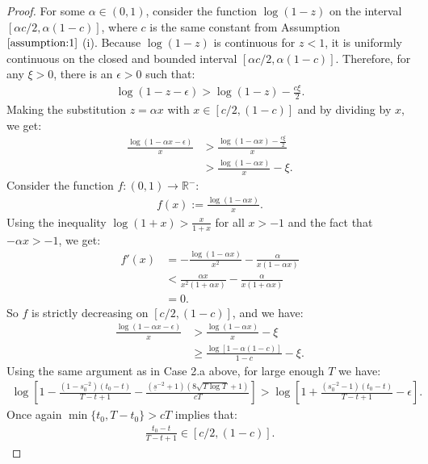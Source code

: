 \documentclass{article}
\begin{document}
\begin{proof}
For some $\alpha \in (0,1)$, consider the function $\log(1 - z)$ on the interval $[\alpha c/2, \alpha (1-c)]$, where $c$ is the same constant from Assumption $\ref{assumption:1}$ (i). Because $\log(1 - z)$ is continuous for $z < 1$, it is uniformly continuous on the closed and bounded interval $[\alpha c/2, \alpha (1-c)]$. Therefore, for any $\xi > 0$, there is an $\epsilon > 0$ such that:
\begin{align*}
     \log(1 - z - \epsilon) > \log(1 - z) - \frac{c \xi}{2}.
\end{align*}
Making the substitution $z = \alpha x$ with $x \in [c/2, (1-c)]$ and by dividing by $x$, we get:
\begin{align*}
     \frac{\log(1 - \alpha x - \epsilon)}{x} &> \frac{\log(1 - \alpha x) -\frac{c \xi}{2}}{x} \\
     &> \frac{\log(1 - \alpha x)}{x} - \xi. \tag{$x \geq c/2$}
\end{align*}
Consider the function $f: (0,1) \to \mathbb{R}^-$:
\begin{align*}
    f(x) := \frac{\log(1 - \alpha x)}{x}.
\end{align*}
Using the inequality $\log(1+x) > \frac{x}{1+x}$ for all $x > - 1$ and the fact that $-\alpha x > -1$, we get:
\begin{align*}
    f'(x) &= -\frac{\log(1 - \alpha x)}{x^2} - \frac{\alpha}{x(1 - \alpha x)} \\
    &< \frac{\alpha x }{x^2(1+\alpha x)} - \frac{\alpha}{x(1 + \alpha x)} \\
    &= 0.
\end{align*}
So $f$ is strictly decreasing on $[c/2, (1-c)]$, and we have:
\begin{align*}
     \frac{\log(1 - \alpha x - \epsilon)}{x} &> \frac{\log(1 - \alpha x)}{x} - \xi \\
     &\geq \frac{\log[1 - \alpha (1-c)]}{1-c} - \xi.
\end{align*}
Using the same argument as in Case 2.a above, for large enough $T$ we have:
\begin{align*}
     \log\left[1 - \frac{\left(1- s_0^{-2}\right)(t_0 - t)}{T - t + 1} -  \frac{(\underline{s}^{-2} + 1)\left(8\sqrt{T\log T} +1\right)}{cT}\right] > \log\left[1 + \frac{\left(s_0^{-2} -1\right)(t_0 - t)}{T - t + 1} - \epsilon\right].
\end{align*}
Once again $\min\{t_0,T-t_0\} > cT$ implies that: 
\begin{align*}
    \frac{t_0 - t}{T - t + 1} \in [c/2, (1-c)].
\end{align*}

\end{proof}
\end{document}
